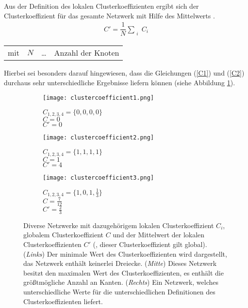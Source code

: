 \documentclass[fontsize=11pt, twoside, a4paper]{scrartcl}
\begin{document}
Aus der Definition des lokalen Clusterkoeffizienten ergibt sich der Clusterkoeffizient für das gesamte Netzwerk mit Hilfe des Mittelwerts \cite{Newman}.
\begin{align}
C' = \dfrac{1}{N} \sum_{\substack{i}} C_{i}
\label{C2}
\end{align}
\begin{table}[H]
\begin{tabular}{rccl}
mit  & $N$ & \ldots & Anzahl der Knoten\\
\end{tabular}
\end{table}
Hierbei sei besonders darauf hingewiesen, dass die Gleichungen (\ref{C1}) und (\ref{C2}) durchaus sehr unterschiedliche Ergebnisse liefern können (siehe Abbildung \ref{Abb15}).
\begin{figure}[H]
\centering
	\begin{minipage}[t]{0.3\textwidth}
		\begin{figure}[H]
		\texttt{[image: clustercoefficient1.png]}
		\caption*{$C_{1,2,3,4}=\lbrace 0,0,0,0\rbrace$\\ $C=0$ \\ $C'=0$}
		\end{figure}
	\end{minipage}
	\begin{minipage}[t]{0.3\textwidth}
		\begin{figure}[H]
		\texttt{[image: clustercoefficient2.png]}
		\caption*{$C_{1,2,3,4}=\lbrace 1,1,1,1\rbrace$\\ $C=1$ \\ $C'=4$}
		\end{figure}
	\end{minipage}
	\begin{minipage}[t]{0.3\textwidth}
		\begin{figure}[H]
		\texttt{[image: clustercoefficient3.png]}
		\caption*{$C_{1,2,3,4}=\lbrace 1,0,1,\frac{1}{3}\rbrace$\\ $C=\frac{7}{12}$ \\ $C'=\frac{2}{3}$}
		\end{figure}
	\end{minipage}
	\caption{Diverse Netzwerke mit dazugehörigem lokalen Clusterkoeffizient $C_{i}$, globalem Clusterkoeffizient $C$ und der Mittelwert der lokalen Clusterkoeffizienten $C'$ (, dieser Clusterkoeffizient gilt global). (\textit{Links}) Der minimale Wert des Clusterkoeffizienten wird dargestellt, das Netzwerk enthält keinerlei Dreiecke. (\textit{Mitte}) Dieses Netzwerk besitzt den maximalen Wert des Clusterkoeffizienten, es enthält die größtmögliche Anzahl an Kanten. (\textit{Rechts}) Ein Netzwerk, welches unterschiedliche Werte für die unterschiedlichen Definitionen des Clusterkoeffizienten liefert.}
\label{Abb15}
\end{figure}
\end{document}
